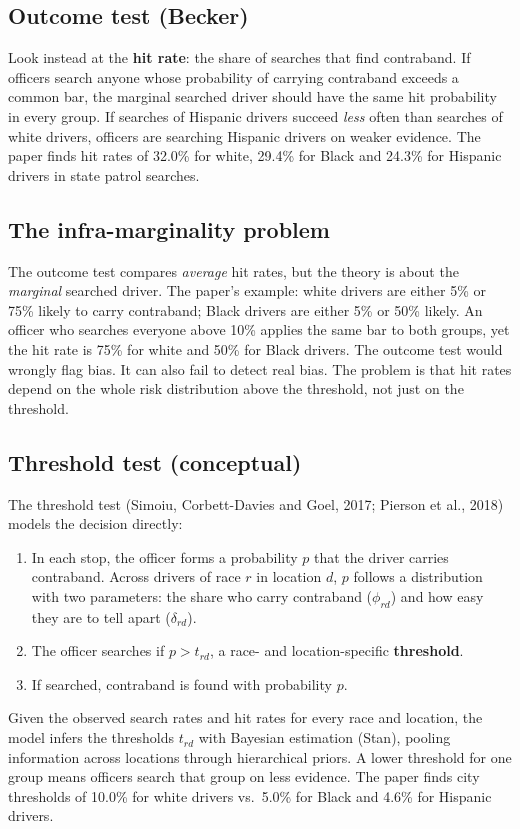 \documentclass[11pt]{article}
\newcommand{\1}{\mathbf{1}}
\begin{document}
\subsection{Outcome test (Becker)}
Look instead at the \textbf{hit rate}: the share of searches that find contraband. If officers search anyone whose probability of carrying contraband exceeds a common bar, the marginal searched driver should have the same hit probability in every group. If searches of Hispanic drivers succeed \emph{less} often than searches of white drivers, officers are searching Hispanic drivers on weaker evidence. The paper finds hit rates of 32.0\% for white, 29.4\% for Black and 24.3\% for Hispanic drivers in state patrol searches.

\subsection{The infra-marginality problem}
The outcome test compares \emph{average} hit rates, but the theory is about the \emph{marginal} searched driver. The paper's example: white drivers are either 5\% or 75\% likely to carry contraband; Black drivers are either 5\% or 50\% likely. An officer who searches everyone above 10\% applies the same bar to both groups, yet the hit rate is 75\% for white and 50\% for Black drivers. The outcome test would wrongly flag bias. It can also fail to detect real bias. The problem is that hit rates depend on the whole risk distribution above the threshold, not just on the threshold.

\subsection{Threshold test (conceptual)}
The threshold test (Simoiu, Corbett-Davies and Goel, 2017; Pierson et al., 2018) models the decision directly:
\begin{enumerate}
  \item In each stop, the officer forms a probability $p$ that the driver carries contraband. Across drivers of race $r$ in location $d$, $p$ follows a distribution with two parameters: the share who carry contraband ($\phi_{rd}$) and how easy they are to tell apart ($\delta_{rd}$).
  \item The officer searches if $p > t_{rd}$, a race- and location-specific \textbf{threshold}.
  \item If searched, contraband is found with probability $p$.
\end{enumerate}
Given the observed search rates and hit rates for every race and location, the model infers the thresholds $t_{rd}$ with Bayesian estimation (Stan), pooling information across locations through hierarchical priors. A lower threshold for one group means officers search that group on less evidence. The paper finds city thresholds of 10.0\% for white drivers vs.\ 5.0\% for Black and 4.6\% for Hispanic drivers.
\end{document}
